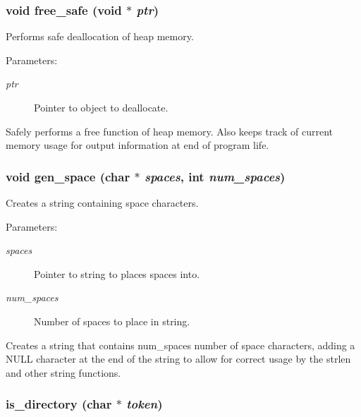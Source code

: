 \subsubsection{\setlength{\rightskip}{0pt plus 5cm}void free\_\-safe (void $\ast$ {\em ptr})}\label{util_8c_a17}


Performs safe deallocation of heap memory.

\begin{Desc}
\item[Parameters: ]\par
\begin{description}
\item[{\em 
ptr}]Pointer to object to deallocate.\end{description}
\end{Desc}
Safely performs a free function of heap memory. Also keeps track of current memory usage for output information at end of program life. 
\subsubsection{\setlength{\rightskip}{0pt plus 5cm}void gen\_\-space (char $\ast$ {\em spaces}, int {\em num\_\-spaces})}\label{util_8c_a18}


Creates a string containing space characters.

\begin{Desc}
\item[Parameters: ]\par
\begin{description}
\item[{\em 
spaces}]Pointer to string to places spaces into. \item[{\em 
num\_\-spaces}]Number of spaces to place in string.\end{description}
\end{Desc}
Creates a string that contains num\_\-spaces number of space characters, adding a NULL character at the end of the string to allow for correct usage by the strlen and other string functions. 
\subsubsection{ is\_\-directory (char $\ast$ {\em token})}\label{util_8c_a8}


